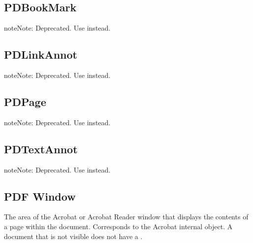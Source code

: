 \documentclass[letterpaper,12pt,english,openany,oneside]{sphinxmanual}
\begin{document}
\subsection{PDBookMark}
\label{\detokenize{IAC_API_AppleEvtObjects:pdbookmark}}
\begin{sphinxadmonition}{note}{Note:}
Deprecated. Use  instead.
\end{sphinxadmonition}




\subsection{PDLinkAnnot}
\label{\detokenize{IAC_API_AppleEvtObjects:pdlinkannot}}
\begin{sphinxadmonition}{note}{Note:}
Deprecated. Use  instead.
\end{sphinxadmonition}


\subsection{PDPage}
\label{\detokenize{IAC_API_AppleEvtObjects:pdpage}}
\begin{sphinxadmonition}{note}{Note:}
Deprecated. Use  instead.
\end{sphinxadmonition}


\subsection{PDTextAnnot}
\label{\detokenize{IAC_API_AppleEvtObjects:pdtextannot}}
\begin{sphinxadmonition}{note}{Note:}
Deprecated. Use  instead.
\end{sphinxadmonition}




\subsection{PDF Window}
\label{\detokenize{IAC_API_AppleEvtObjects:pdf-window}}
The area of the Acrobat or Acrobat Reader window that displays the contents of a page within the document. Corresponds to the Acrobat internal  object. A document that is not visible does not have a .
\end{document}
